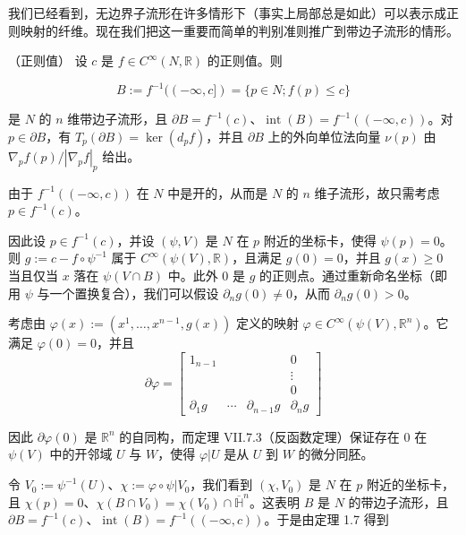 我们已经看到，无边界子流形在许多情形下（事实上局部总是如此）可以表示成正则映射的纤维。现在我们把这一重要而简单的判别准则推广到带边子流形的情形。

\begin{theorem}

（正则值） 设 $ c $ 是 $ f \in C^{\infty}(N, \mathbb{R}) $ 的正则值。则

\[
B := f^{-1}((-\infty, c]) = \{p \in N ; f(p) \le c\}
\]

是 $ N $ 的 $ n $ 维带边子流形，且 $ \partial B = f^{-1}(c) $、$ \operatorname{int}(B) = f^{-1}((-\infty, c)) $。对 $ p \in \partial B $，有 $ T_{p}(\partial B) = \ker(d_{p}f) $，并且 $ \partial B $ 上的外向单位法向量 $ \nu(p) $ 由 $ \nabla_{p}f(p)/|\nabla_{p}f|_{p} $ 给出。

\proofhead
由于 $ f^{-1}((-\infty, c)) $ 在 $ N $ 中是开的，从而是 $ N $ 的 $ n $ 维子流形，故只需考虑 $ p \in f^{-1}(c) $。

因此设 $ p \in f^{-1}(c) $，并设 $ (\psi, V) $ 是 $ N $ 在 $ p $ 附近的坐标卡，使得 $ \psi(p) = 0 $。则 $ g := c - f \circ \psi^{-1} $ 属于 $ C^{\infty}(\psi(V), \mathbb{R}) $，且满足 $ g(0) = 0 $，并且 $ g(x) \ge 0 $ 当且仅当 $ x $ 落在 $ \psi(V \cap B) $ 中。此外 $ 0 $ 是 $ g $ 的正则点。通过重新命名坐标（即用 $ \psi $ 与一个置换复合），我们可以假设 $ \partial_{n}g(0) \ne 0 $，从而 $ \partial_{n}g(0) > 0 $。

考虑由 $ \varphi(x) := (x^{1}, \ldots, x^{n-1}, g(x)) $ 定义的映射 $ \varphi \in C^{\infty}(\psi(V), \mathbb{R}^{n}) $。它满足 $ \varphi(0) = 0 $，并且
\begin{equation*}
\partial\varphi = \begin{bmatrix} 1_{n-1} & & & 0 \\ & & & \vdots \\ & & & 0 \\ \partial_{1}g & \cdots & \partial_{n-1}g & \partial_{n}g \end{bmatrix}
\end{equation*}

因此 $ \partial\varphi(0) $ 是 $ \mathbb{R}^{n} $ 的自同构，而定理 VII.7.3（反函数定理）保证存在 $ 0 $ 在 $ \psi(V) $ 中的开邻域 $ U $ 与 $ W $，使得 $ \varphi|U $ 是从 $ U $ 到 $ W $ 的微分同胚。

令 $ V_{0} := \psi^{-1}(U) $、$ \chi := \varphi \circ \psi|V_{0} $，我们看到 $ (\chi, V_{0}) $ 是 $ N $ 在 $ p $ 附近的坐标卡，且 $ \chi(p) = 0 $、$ \chi(B \cap V_{0}) = \chi(V_{0}) \cap \overline{\mathbb{H}}^{n} $。这表明 $ B $ 是 $ N $ 的带边子流形，且 $ \partial B = f^{-1}(c) $、$ \operatorname{int}(B) = f^{-1}((-\infty, c)) $。于是由定理 1.7 得到


\end{theorem}
